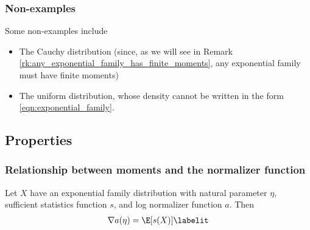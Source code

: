 \documentclass{article} %
\newcommand{\logNormalizerFunction}{a}
\newcommand{\sufficientStatsFunction}{s}
\begin{document}
\subsubsection{Non-examples}

Some non-examples include 
\begin{itemize}
\item The Cauchy distribution (since, as we will see in Remark \ref{rk:any_exponential_family_has_finite_moments}, any exponential family must have finite moments)
\item The uniform distribution, whose density cannot be written in the form \eqref{eqn:exponential_family}. %
\end{itemize}


\subsection{Properties}

\subsubsection{Relationship between moments and the normalizer function} \label{sec:relationship_between_moments_and_normalizer}

\begin{proposition}
Let $X$ have an exponential family distribution with natural parameter $\eta$, sufficient statistics function $\sufficientStatsFunction$, and log normalizer function $\logNormalizerFunction$.   Then  
\begin{align*}
\nabla \logNormalizerFunction(\eta) = \E[\sufficientStatsFunction(X)] 
\labelit \label{eqn:expected_sufficient_statistic_as_derivative_of_log_normalizer}	
\end{align*}
\label{prop:expected_sufficient_statistic_as_derivative_of_log_normalizer}
\end{proposition}
\end{document}
